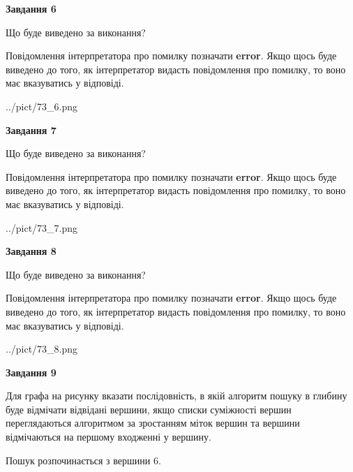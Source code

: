 \documentclass[12pt, ukrainian]{article}
\begin{document}
{\begin {large}
{\begin {center}\textbf{Завдання 6}\end {center}}\par
Що буде виведено за виконання?

Повідомлення інтерпретатора про помилку позначати \textbf{error}.
Якщо щось буде виведено до того, як інтерпретатор видасть повідомлення про помилку, 
то воно має вказуватись у відповіді. \par


\begin{center}
	{../pict/73_6.png}
\end{center}
\newpage

{\begin {center}\textbf{Завдання 7}\end {center}}\par
Що буде виведено за виконання?

Повідомлення інтерпретатора про помилку позначати \textbf{error}.
Якщо щось буде виведено до того, як інтерпретатор видасть повідомлення про помилку, 
то воно має вказуватись у відповіді. \par


\begin{center}
	{../pict/73_7.png}
\end{center}
\newpage

{\begin {center}\textbf{Завдання 8}\end {center}}\par
Що буде виведено за виконання?

Повідомлення інтерпретатора про помилку позначати \textbf{error}.
Якщо щось буде виведено до того, як інтерпретатор видасть повідомлення про помилку, 
то воно має вказуватись у відповіді. \par


\begin{center}
	{../pict/73_8.png}
\end{center}
\newpage

{\begin {center}\textbf{Завдання 9}\end {center}}\par
Для графа на рисунку вказати послідовність, в якій алгоритм пошуку в глибину буде відмічати відвідані вершини, якщо списки суміжності вершин переглядаються алгоритмом за зростанням міток вершин та вершини відмічаються на першому вход\-женні у вершину.\par
Пошук розпочинається з вершини 6.\par


\end{large}}
\end{document}
